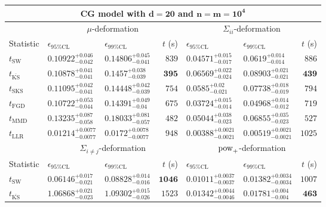 \begin{tabular}{l|llr|llr}
	\toprule
	\multicolumn{7}{c}{{\bf CG model with $\mathbf{d=20}$ and $\mathbf{n=m=10^{4}}$}} \\
	\toprule
	\multicolumn{1}{c}{} & \multicolumn{3}{c}{$\mu$-deformation} & \multicolumn{3}{c}{$\Sigma_{ii}$-deformation} \\
	Statistic & $\epsilon_{95\%\mathrm{CL}}$ & $\epsilon_{99\%\mathrm{CL}}$ & $t$ (s) & $\epsilon_{95\%\mathrm{CL}}$ & $\epsilon_{99\%\mathrm{CL}}$ & $t$ (s) \\
	\midrule
	$t_{\mathrm{SW}}$ & $0.10922_{-0.042}^{+0.046}$ & $0.14806_{-0.041}^{+0.045}$ & $839$ & $0.04571_{-0.017}^{+0.015}$ & $0.0619_{-0.014}^{+0.014}$ & $886$ \\
	$t_{\overline{\mathrm{KS}}}$ & $0.10878_{-0.041}^{+0.041}$ & $0.1457_{-0.039}^{+0.038}$ & ${\mathbf{395}}$ & $0.06569_{-0.024}^{+0.022}$ & $0.08903_{-0.021}^{+0.021}$ & ${\mathbf{439}}$ \\
	$t_{\mathrm{SKS}}$ & $0.11095_{-0.041}^{+0.042}$ & $0.14448_{-0.039}^{+0.042}$ & $754$ & $0.0585_{-0.021}^{+0.02}$ & $0.07738_{-0.019}^{+0.018}$ & $794$ \\
	$t_{\mathrm{FGD}}$ & ${\mathbf{0.10722_{-0.044}^{+0.053}}}$ & ${\mathbf{0.14391_{-0.04}^{+0.049}}}$ & $675$ & ${\mathbf{0.03724_{-0.014}^{+0.015}}}$ & ${\mathbf{0.04968_{-0.012}^{+0.014}}}$ & $719$ \\
	$t_{\mathrm{MMD}}$ & $0.13235_{-0.058}^{+0.087}$ & $0.18033_{-0.057}^{+0.081}$ & $482$ & $0.05044_{-0.023}^{+0.038}$ & $0.06855_{-0.023}^{+0.035}$ & $527$ \\
	$t_{\mathrm{LLR}}$ & $0.01214_{-0.0077}^{+0.0077}$ & $0.0172_{-0.0077}^{+0.0078}$ & $948$ & $0.00388_{-0.0021}^{+0.0021}$ & $0.00519_{-0.0021}^{+0.0021}$ & $1025$ \\
	\toprule
	\multicolumn{1}{c}{} & \multicolumn{3}{c}{$\Sigma_{i\neq j}$-deformation} & \multicolumn{3}{c}{$\rm{pow}_{+}$-deformation} \\
	Statistic & $\epsilon_{95\%\mathrm{CL}}$ & $\epsilon_{99\%\mathrm{CL}}$ & $t$ (s) & $\epsilon_{95\%\mathrm{CL}}$ & $\epsilon_{99\%\mathrm{CL}}$ & $t$ (s) \\
	\midrule
	$t_{\mathrm{SW}}$ & $0.06146_{-0.021}^{+0.017}$ & $0.08828_{-0.016}^{+0.014}$ & ${\mathbf{1046}}$ & $0.01011_{-0.0037}^{+0.0037}$ & $0.01382_{-0.0034}^{+0.0034}$ & $1007$ \\
	$t_{\overline{\mathrm{KS}}}$ & $1.06868_{-0.023}^{+0.021}$ & $1.09302_{-0.026}^{+0.015}$ & $1523$ & $0.01342_{-0.0046}^{+0.0044}$ & $0.01781_{-0.004}^{+0.004}$ & ${\mathbf{463}}$ \\

\end{tabular}
